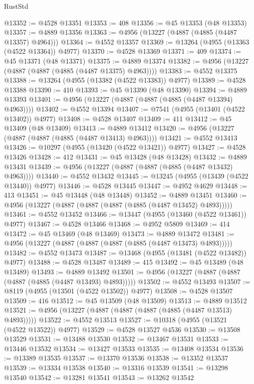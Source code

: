 \begin{lexlean}{RustStd}
\begin{coremodule}
@13352 := @4528 @13351
@13353 := 408
@13356 := @45 @13353 (@48 @13353)
@13357 := @4889 @13356
@13363 := @4956 (@13227 (@4887 (@4885 (@4487 @13357) @4964)))
@13364 := @4552 @13357
@13369 := @13264 (@4955 (@13363 (@4522 @13364)) @4977)
@13370 := @4528 @13369
@13371 := 409
@13374 := @45 @13371 (@48 @13371)
@13375 := @4889 @13374
@13382 := @4956 (@13227 (@4887 (@4887 (@4885 (@4487 @13375) @4963))))
@13383 := @4552 @13375
@13388 := @13264 (@4955 (@13382 (@4522 @13383)) @4977)
@13389 := @4528 @13388
@13390 := 410
@13393 := @45 @13390 (@48 @13390)
@13394 := @4889 @13393
@13401 := @4956 (@13227 (@4887 (@4887 (@4885 (@4487 @13394) @4963))))
@13402 := @4552 @13394
@13407 := @7541 (@4955 (@13401 (@4522 @13402)) @4977)
@13408 := @4528 @13407
@13409 := 411
@13412 := @45 @13409 (@48 @13409)
@13413 := @4889 @13412
@13420 := @4956 (@13227 (@4887 (@4887 (@4885 (@4487 @13413) @4963))))
@13421 := @4552 @13413
@13426 := @10297 (@4955 (@13420 (@4522 @13421)) @4977)
@13427 := @4528 @13426
@13428 := 412
@13431 := @45 @13428 (@48 @13428)
@13432 := @4889 @13431
@13439 := @4956 (@13227 (@4887 (@4887 (@4885 (@4487 @13432) @4963))))
@13440 := @4552 @13432
@13445 := @13245 (@4955 (@13439 (@4522 @13440)) @4977)
@13446 := @4528 @13445
@13447 := @4952 @4629
@13448 := 413
@13451 := @45 @13448 (@48 @13448)
@13452 := @4889 @13451
@13460 := @4956 (@13227 (@4887 (@4887 (@4887 (@4885 (@4487 @13452) @4893)))))
@13461 := @4552 @13452
@13466 := @13447 (@4955 (@13460 (@4522 @13461)) @4977)
@13467 := @4528 @13466
@13468 := @4952 @5809
@13469 := 414
@13472 := @45 @13469 (@48 @13469)
@13473 := @4889 @13472
@13481 := @4956 (@13227 (@4887 (@4887 (@4887 (@4885 (@4487 @13473) @4893)))))
@13482 := @4552 @13473
@13487 := @13468 (@4955 (@13481 (@4522 @13482)) @4977)
@13488 := @4528 @13487
@13489 := 415
@13492 := @45 @13489 (@48 @13489)
@13493 := @4889 @13492
@13501 := @4956 (@13227 (@4887 (@4887 (@4887 (@4885 (@4487 @13493) @4893)))))
@13502 := @4552 @13493
@13507 := @8119 (@4955 (@13501 (@4522 @13502)) @4977)
@13508 := @4528 @13507
@13509 := 416
@13512 := @45 @13509 (@48 @13509)
@13513 := @4889 @13512
@13521 := @4956 (@13227 (@4887 (@4887 (@4887 (@4885 (@4487 @13513) @4893)))))
@13522 := @4552 @13513
@13527 := @10318 (@4955 (@13521 (@4522 @13522)) @4977)
@13529 := @4528 @13527 @4536
@13530 := @13508 @13529
@13531 := @13488 @13530
@13532 := @13467 @13531
@13533 := @13446 @13532
@13534 := @13427 @13533
@13535 := @13408 @13534
@13536 := @13389 @13535
@13537 := @13370 @13536
@13538 := @13352 @13537
@13539 := @13334 @13538
@13540 := @13316 @13539
@13541 := @13298 @13540
@13542 := @13281 @13541
@13543 := @13262 @13542

\end{coremodule}
\end{lexlean}
